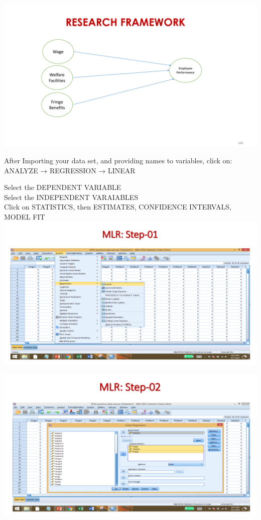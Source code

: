 \documentclass[
  letterpaper,
  DIV=11,
  numbers=noendperiod]{scrreprt}
\begin{document}
\includegraphics{images/slides/img_Page_149.png}

After Importing your data set, and providing names to variables, click
on:\\

{ANALYZE → REGRESSION → LINEAR}

Select the DEPENDENT VARIABLE\\
Select the INDEPENDENT VARAIABLES\\
Click on STATISTICS, then ESTIMATES, CONFIDENCE INTERVALS, MODEL FIT\\

\includegraphics{images/slides/img_Page_151.png}

\includegraphics{images/slides/img_Page_152.png}
\end{document}
